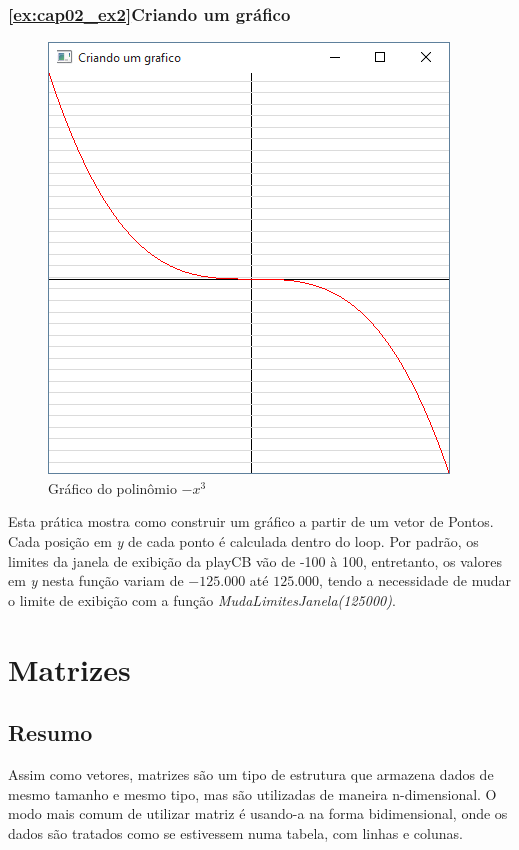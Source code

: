 \subsection{\ref{ex:cap02_ex2}Criando um gráfico}
\begin{figure}[ht]
  \centerline{\includegraphics[width=.5\textwidth]{img/cap2_ex8.png}}
  \caption{Gráfico do polinômio $-x^3$}
  \label{fig:cap02_ex1}
\end{figure}
Esta prática mostra como construir um gráfico a partir de um vetor de Pontos. Cada posição em \emph{y} de cada ponto é calculada dentro do loop. Por padrão, os limites da janela de exibição da playCB vão de -100 à 100, entretanto, os valores em \emph{y} nesta função variam de $-125.000$ até $125.000$, tendo a necessidade de mudar o limite de exibição com a função \emph{MudaLimitesJanela(125000)}.


\chapter[Matrizes]
{Matrizes}



\section{Resumo}

Assim como vetores, matrizes são um tipo de estrutura que armazena dados de mesmo tamanho e mesmo tipo, mas são utilizadas de maneira n-dimensional. O modo mais comum de utilizar matriz é usando-a na forma bidimensional, onde os dados são tratados como se estivessem numa tabela, com linhas e colunas.


%
%

